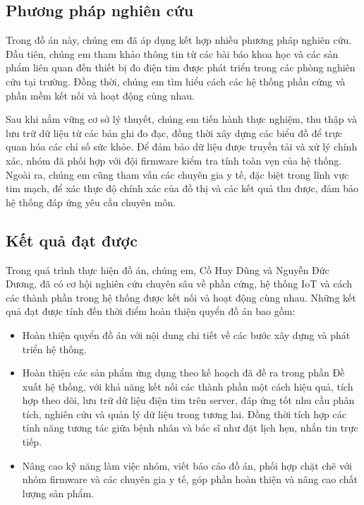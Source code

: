\subsection*{Phương pháp nghiên cứu}
Trong đồ án này, chúng em đã áp dụng kết hợp nhiều phương pháp nghiên cứu. Đầu tiên, chúng em tham khảo thông tin từ các bài báo khoa học và các sản phẩm liên quan đến thiết bị đo điện tim được phát triển trong các phòng nghiên cứu tại trường.
Đồng thời, chúng em tìm hiểu cách các hệ thống phần cứng và phần mềm kết nối và hoạt động cùng nhau. 

Sau khi nắm vững cơ sở lý thuyết, chúng em tiến hành thực nghiệm, thu thập và lưu trữ dữ liệu từ các bản ghi đo đạc, đồng thời xây dựng các biểu đồ để trực quan hóa các chỉ số sức khỏe. Để đảm bảo dữ liệu được truyền tải và xử lý chính xác, nhóm đã phối hợp với đội firmware kiểm tra tính toàn vẹn của hệ thống.
Ngoài ra, chúng em cũng tham vấn các chuyên gia y tế, đặc biệt trong lĩnh vực tim mạch, để xác thực độ chính xác của đồ thị và các kết quả thu được, đảm bảo hệ thống đáp ứng yêu cầu chuyên môn.
\subsection*{Kết quả đạt được}

Trong quá trình thực hiện đồ án, chúng em, Cồ Huy Dũng và Nguyễn Đức Dương, đã có cơ hội nghiên cứu chuyên sâu về phần cứng, hệ thống IoT và cách các thành phần trong hệ thống được kết nối và hoạt động cùng nhau.
Những kết quả đạt được tính đến thời điểm hoàn thiện quyển đồ án bao gồm:

\begin{adjustwidth}{1.5em}{}
  \begin{itemize}
      \item Hoàn thiện quyển đồ án với nội dung chi tiết về các bước xây dựng và phát triển hệ thống.
      \item Hoàn thiện các sản phẩm ứng dụng theo kế hoạch đã đề ra trong phần Đề xuất hệ thống, với khả năng kết nối các thành phần một cách hiệu quả, tích hợp theo dõi, lưu trữ dữ liệu điện tim trên server, đáp ứng tốt nhu cầu phân tích, nghiên cứu và quản lý dữ liệu trong tương lai.
      Đồng thời tích hợp các tính năng tương tác giữa bệnh nhân và bác sĩ như đặt lịch hẹn, nhắn tin trực tiếp.
      \item Nâng cao kỹ năng làm việc nhóm, viết báo cáo đồ án, phối hợp chặt chẽ với nhóm firmware và các chuyên gia y tế, góp phần hoàn thiện và nâng cao chất lượng sản phẩm.
    \end{itemize}
  \end{adjustwidth}
